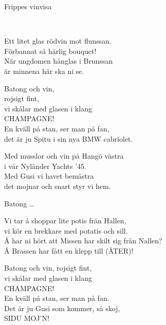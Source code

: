 \begin{song}{Frippes vinvisa}
	


	\\
	
	Ett litet glas rödvin mot flunssan.\\
	Förbannat så härlig bouquet!\\
	När ungdomen hånglas i Brunssan\\
	är minnena här ska ni se.
	
	Batong och vin,\\
	rojsigt fint,\\
	vi skålar med glasen i klang\\
	CHAMPAGNE!\\
	En kväll på stan, ser man på fan,\\
	det är ju Spitu i sin nya BMW cabriolet.
	
	Med musslor och vin på Hangö västra\\
	i vår Nyländer Yachts '45.\\
	Med Gusi vi havet bemästra\\
	det mojnar och snart styr vi hem.
	
	Batong \ldots{}
	
	Vi tar å shoppar lite potis från Hallen,\\
	vi kör en brekkare med potatis och sill.\\
	Å har ni hört att Missen har skilt sig från Nallen?\\
	Å Brassen har fått en klepp till (ÅTER)!
	
	Batong och vin, rojsigt fint,\\
	vi skålar med glasen i klang\\
	CHAMPAGNE!\\
	En kväll på stan, ser man på fan.\\
	Det är ju Gusi som kommer, så skoj,\\
	SIDU MOJ'N!
	
\end{song}
